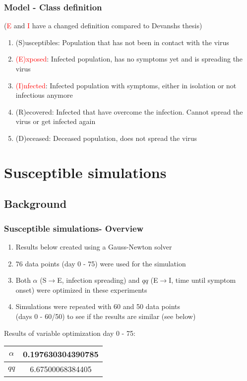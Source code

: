 \documentclass{beamer}
\begin{document}
\begin{frame}
	\frametitle{Model - Class definition}
	(\textcolor{red}{E} and \textcolor{red}{I} have a changed definition compared to Devanshs thesis)\newline
	\begin{enumerate}[$\bullet$]
		\item (S)usceptibles: Population that has not been in contact with the virus
		\item \textcolor{red}{(E)xposed}: Infected population, has no symptoms yet and is spreading the virus
		\item \textcolor{red}{(I)nfected}: Infected population with symptoms, either in isolation or not infectious anymore
		\item (R)ecovered: Infected that have overcome the infection. Cannot spread the virus or get infected again
		\item (D)eceased: Deceased population, does not spread the virus
	\end{enumerate}

\end{frame}

\section{Susceptible simulations}
\subsection{Background}
\begin{frame}
	\frametitle{Susceptible simulations- Overview}
	\begin{enumerate}[$\bullet$]
		\item Results below created using a Gauss-Newton solver
		\item 76 data points (day 0 - 75) were used for the simulation
		\item Both $\alpha$ (S$\rightarrow$E, infection spreading) and $qq$ (E$\rightarrow$I, time until symptom onset) were optimized in these experiments
		\item Simulations were repeated with 60 and 50 data points\\(days 0 - 60/50) to see if the results are similar (see below)
	\end{enumerate}
	\vspace{0.5cm}
	Results of variable optimization day 0 - 75:
	\begin{center}
	\begin{tabular}{|c|c|}
		\hline $\alpha$ & 0.197630304390785 \\
		\hline $qq$ & 6.67500068384405 \\ \hline
	\end{tabular}
	\end{center}
\end{frame}
\end{document}
